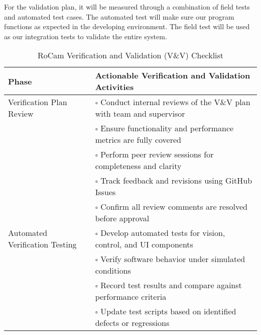 \documentclass[12pt, titlepage]{article}
\begin{document}
For the validation plan, it will be measured through a combination of field
tests and automated test cases. The automated test will make sure our program
functions as expected in the developing environment. The field test will be
used as our integration tests to validate the entire system.


\begin{table}[H]
  \centering
  \caption{RoCam Verification and Validation (V\&V) Checklist}
  \label{tab:rocam_vnv_checklist}
  \renewcommand{\arraystretch}{1.3}
  \setlength{\tabcolsep}{8pt}
  \begin{tabular}{|p{4.4cm}|p{10.1cm}|}
    \hline
    \textbf{Phase}                 & \textbf{Actionable Verification and Validation Activities}                             \\ \hline

    Verification Plan Review       & $\square$ \; Conduct internal reviews of the V\&V
    plan with team and supervisor                                                                                           \\[-2pt]
                                   & $\square$ \; Ensure functionality and performance metrics are fully covered            \\[-2pt]
                                   & $\square$ \; Perform peer review sessions for completeness and clarity                 \\[-2pt]
                                   & $\square$ \; Track feedback and revisions using GitHub Issues                          \\[-2pt]
                                   & $\square$ \; Confirm all review comments are resolved before approval                  \\ \hline

    Automated Verification Testing & $\square$ \; Develop automated tests for
    vision, control, and UI components                                                                                      \\[-2pt]
                                   & $\square$ \; Verify software behavior under simulated conditions                       \\[-2pt]
                                   & $\square$ \; Record test results and compare against performance criteria              \\[-2pt]
                                   & $\square$ \; Update test scripts based on identified defects or regressions            \\ \hline


\end{tabular}
\end{table}
\end{document}
